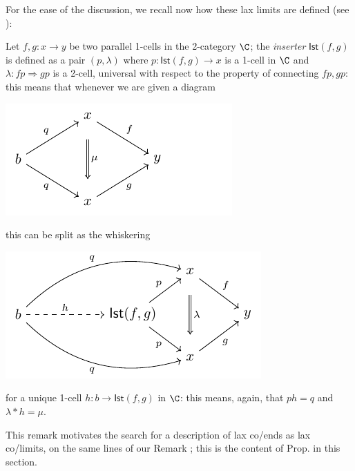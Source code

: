For the ease of the discussion, we recall now how these lax limits are defined (see \cite[\S\textbf{4}]{2catlimits}):
\begin{definition}
Let $f,g\colon x\to y$ be two parallel 1-cells in the 2-category $\C$; the \emph{inserter} $\textsf{Ist}(f,g)$ is defined as a pair $(p,\lambda)$ where $p\colon \textsf{Ist}(f,g)\to x$ is a 1-cell in $\C$ and $\lambda\colon fp \Rightarrow gp$ is a 2-cell, universal with respect to the property of connecting $fp, gp$: this means that whenever we are given a diagram
\begin{center}
\includegraphics[scale=1]{figures/fig6}
\end{center}
this can be split as the whiskering
\begin{center}
\includegraphics[scale=1]{figures/fig7}
\end{center}
for a unique 1-cell $h\colon b\to \textsf{Ist}(f,g)$ in $\C$: this means, again, that $ph=q$ and $\lambda * h = \mu$.
\end{definition}
This remark motivates the search for a description of lax co/ends as lax co/limits, on the same lines of our Remark ; this is the content of Prop\@.  in this section.


